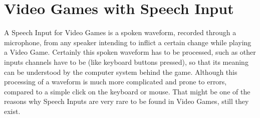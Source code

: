 \section{Video Games with Speech Input}
A Speech Input for Video Games is a spoken waveform, recorded through a microphone, from any speaker intending to inflict a certain change while playing a Video Game. Certainly this spoken waveform has to be processed, such as other inputs channels have to be (like keyboard buttons pressed), so that its meaning can be understood by the computer system behind the game. Although this processing of a waveform is much more complicated and prone to errors, compared to a simple click on the keyboard or mouse. That might be one of the reasons why Speech Inputs are very rare to be found in Video Games, still they exist.